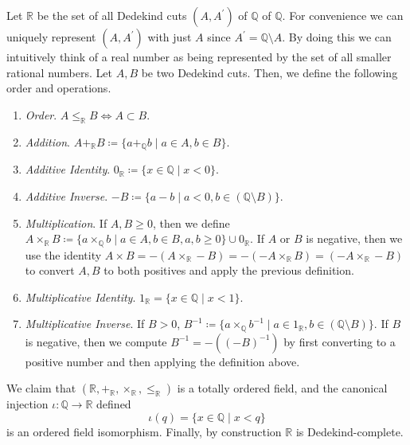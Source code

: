   \begin{theorem}
    Let $\mathbb{R}$ be the set of all Dedekind cuts $(A, A^\prime)$ of $\mathbb{Q}$ of $\mathbb{Q}$. For convenience we can uniquely represent $(A, A^\prime)$ with just $A$ since $A^\prime = \mathbb{Q} \setminus A$. By doing this we can intuitively think of a real number as being represented by the set of all smaller rational numbers. Let $A, B$ be two Dedekind cuts. Then, we define the following order and operations. 
    \begin{enumerate}
      \item \textit{Order}. $A \leq_{\mathbb{R}} B \iff A \subset B$. 
      \item \textit{Addition}. $A +_{\mathbb{R}} B \coloneqq \{ a +_{\mathbb{Q}} b \mid a \in A, b \in B \}$. 
      \item \textit{Additive Identity}. $0_{\mathbb{R}} \coloneqq \{x \in \mathbb{Q} \mid x < 0 \}$. 
      \item \textit{Additive Inverse}. $-B \coloneqq \{ a - b \mid a < 0 , b \in (\mathbb{Q} \setminus B) \}$.
      \item \textit{Multiplication}. If $A, B \geq 0$, then we define $A \times_{\mathbb{R}} B \coloneqq \{ a \times_{\mathbb{Q}} b \mid a \in A, b \in B, a, b \geq 0\} \cup 0_{\mathbb{R}}$. If $A$ or $B$ is negative, then we use the identity $A \times B = -(A \times_{\mathbb{R}} -B) = -(-A \times_{\mathbb{R}} B) = (-A \times_{\mathbb{R}} -B)$ to convert $A, B$ to both positives and apply the previous definition. 
      \item \textit{Multiplicative Identity}. $1_{\mathbb{R}} = \{x \in \mathbb{Q} \mid x < 1 \}$. 
      \item \textit{Multiplicative Inverse}. If $B > 0$, $B^{-1} \coloneqq \{ a \times_{\mathbb{Q}} b^{-1} \mid a \in 1_{\mathbb{R}}, b \in (\mathbb{Q} \setminus B) \}$. If $B$ is negative, then we compute $B^{-1} = -((-B)^{-1})$ by first converting to a positive number and then applying the definition above. 
    \end{enumerate}
    We claim that $(\mathbb{R}, +_{\mathbb{R}}, \times_{\mathbb{R}}, \leq_{\mathbb{R}})$ is a totally ordered field, and the canonical injection $\iota: \mathbb{Q} \rightarrow \mathbb{R}$ defined 
    \begin{equation}
      \iota(q) = \{x \in \mathbb{Q} \mid x < q \}
    \end{equation}
    is an ordered field isomorphism. Finally, by construction $\mathbb{R}$ is Dedekind-complete. 
  \end{theorem} 


